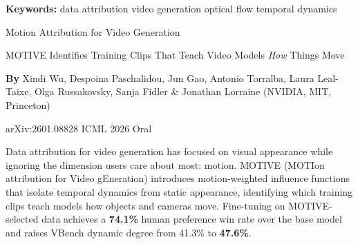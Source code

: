 \documentclass[10pt,twocolumn]{article}
\begin{document}
\setlength{\parindent}{0pt}
\setlength{\parskip}{4pt}

{\small\color{keywordgray}\textbf{Keywords:}
  data attribution \textbullet{}
  video generation \textbullet{}
  optical flow \textbullet{}
  temporal dynamics}\par\vspace{4pt}

{\LARGE\bfseries\raggedright
  Motion Attribution for Video Generation}\par\vspace{4pt}

{\large\itshape\raggedright
  MOTIVE Identifies Training Clips That Teach Video
  Models \emph{How} Things Move}\par\vspace{6pt}

{\small\textbf{By} Xindi Wu, Despoina Paschalidou, Jun Gao, Antonio Torralba,
  Laura Leal-Taixe, Olga Russakovsky, Sanja Fidler \& Jonathan Lorraine
  (NVIDIA, MIT, Princeton)}\par\vspace{2pt}

{\small\color{keywordgray}arXiv:2601.08828 \textbullet{}
  ICML 2026 Oral}
\par\vspace{2pt}\noindent{\color{rulered}\rule{\columnwidth}{0.6pt}}\vspace{6pt}

Data attribution for video generation has focused on visual appearance while
ignoring the dimension users care about most: motion. MOTIVE (MOTIon attribution
for Video gEneration) introduces motion-weighted influence functions that isolate
temporal dynamics from static appearance, identifying which training clips teach
models how objects and cameras move. Fine-tuning on MOTIVE-selected data achieves
a \textbf{74.1\%} human preference win rate over the base model and raises
VBench dynamic degree from 41.3\% to \textbf{47.6\%}.
\end{document}
